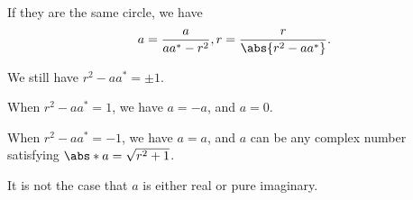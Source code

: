 \begin{enumerate}
          If they are the same circle, we have
          \[
              a = \frac{a}{a a^* - r^2}, r = \frac{r}{\abs{r^2 - a a^*}}.
          \]

          We still have \(r^2 - a a^* = \pm 1\).

          When \(r^2 - a a^* = 1\), we have \(a = -a\), and \(a = 0\).

          When \(r^2 - a a^* = -1\), we have \(a = a\), and \(a\) can be any complex number satisfying \(\abs*{a} = \sqrt{r^2 + 1}\).

          It is not the case that \(a\) is either real or pure imaginary.
\end{enumerate}